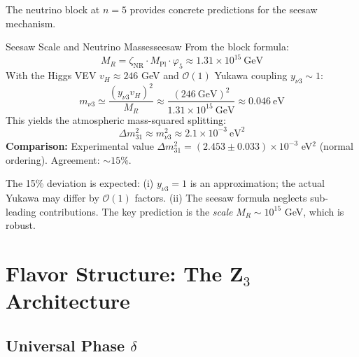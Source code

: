 The neutrino block at $n = 5$ provides concrete predictions for the seesaw mechanism.

\begin{corollary}{Seesaw Scale and Neutrino Masses}{seesaw}
From the block formula:
\begin{equation}
    M_R = \zeta_{\text{NR}} \cdot M_{\mathrm{Pl}} \cdot \varphi_5 
    \approx 1.31 \times 10^{15}~\text{GeV}
\end{equation}
With the Higgs VEV $v_H \approx 246$ GeV and $\mathcal{O}(1)$ Yukawa coupling $y_{\nu 3} \sim 1$:
\begin{equation}
    m_{\nu 3} \simeq \frac{(y_{\nu 3} v_H)^2}{M_R} 
    \approx \frac{(246~\text{GeV})^2}{1.31 \times 10^{15}~\text{GeV}} 
    \approx 0.046~\text{eV}
\end{equation}
This yields the atmospheric mass-squared splitting:
\begin{equation}
    \Delta m^2_{31} \approx m_{\nu 3}^2 \approx 2.1 \times 10^{-3}~\text{eV}^2
\end{equation}
\textbf{Comparison:} Experimental value $\Delta m^2_{31} = (2.453 \pm 0.033) \times 10^{-3}$ eV$^2$ 
(normal ordering). Agreement: $\sim 15\%$.
\end{corollary}

\begin{remark}
The 15\% deviation is expected: (i) $y_{\nu 3} = 1$ is an approximation; the 
actual Yukawa may differ by $\mathcal{O}(1)$ factors. (ii) The seesaw formula 
neglects sub-leading contributions. The key prediction is the \emph{scale} 
$M_R \sim 10^{15}$ GeV, which is robust.
\end{remark}

\section{\texorpdfstring{Flavor Structure: The Z$_3$ Architecture}{Flavor Structure: The Z3 Architecture}}

\subsection{\texorpdfstring{Universal Phase $\delta$}{Universal Phase delta}}

